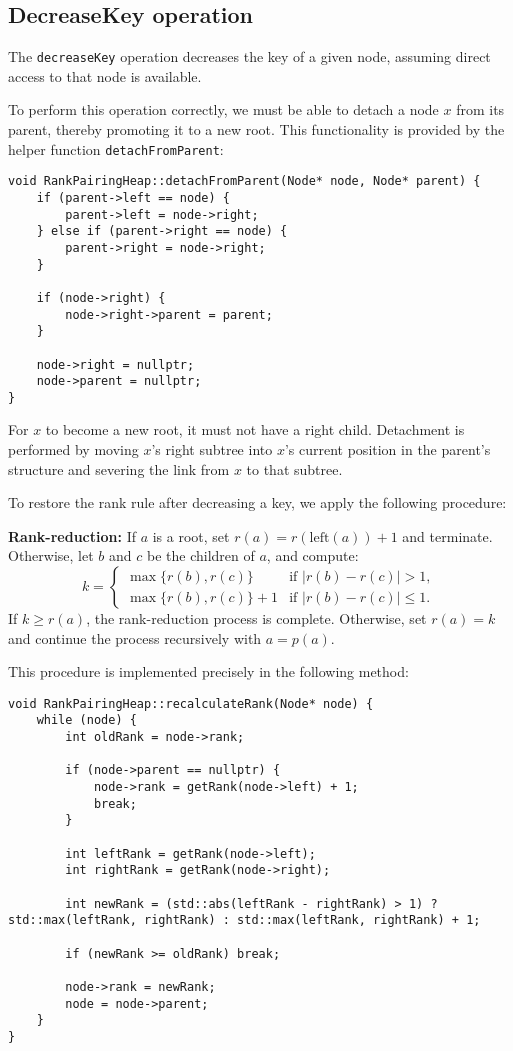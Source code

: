 \subsection{DecreaseKey operation}

The \texttt{decreaseKey} operation decreases the key of a given node, assuming direct access to that node is available.

To perform this operation correctly, we must be able to detach a node \(x\) from its parent, thereby promoting it to a new root. This functionality is provided by the helper function \texttt{detachFromParent}:

\begin{verbatim}
void RankPairingHeap::detachFromParent(Node* node, Node* parent) {
    if (parent->left == node) {
        parent->left = node->right;
    } else if (parent->right == node) {
        parent->right = node->right;
    }
    
    if (node->right) {
        node->right->parent = parent;
    }
    
    node->right = nullptr;
    node->parent = nullptr;
}
\end{verbatim}

For \(x\) to become a new root, it must not have a right child. Detachment is performed by moving \(x\)'s right subtree into \(x\)'s current position in the parent's structure and severing the link from \(x\) to that subtree.

To restore the rank rule after decreasing a key, we apply the following procedure:

\textbf{Rank-reduction:} If \(a\) is a root, set \(r(a) = r(\text{left}(a)) + 1\) and terminate. Otherwise, let \(b\) and \(c\) be the children of \(a\), and compute:
\[
k = 
\begin{cases}
\max\{r(b), r(c)\} & \text{if } |r(b) - r(c)| > 1, \\
\max\{r(b), r(c)\} + 1 & \text{if } |r(b) - r(c)| \leq 1.
\end{cases}
\]
If \(k \geq r(a)\), the rank-reduction process is complete. Otherwise, set \(r(a) = k\) and continue the process recursively with \(a = p(a)\).

This procedure is implemented precisely in the following method:

\begin{verbatim}
void RankPairingHeap::recalculateRank(Node* node) {
    while (node) {
        int oldRank = node->rank;
        
        if (node->parent == nullptr) {
            node->rank = getRank(node->left) + 1;
            break;
        }
        
        int leftRank = getRank(node->left);
        int rightRank = getRank(node->right);

        int newRank = (std::abs(leftRank - rightRank) > 1) ? std::max(leftRank, rightRank) : std::max(leftRank, rightRank) + 1;
        
        if (newRank >= oldRank) break;
        
        node->rank = newRank;
        node = node->parent;
    }
}
\end{verbatim}

